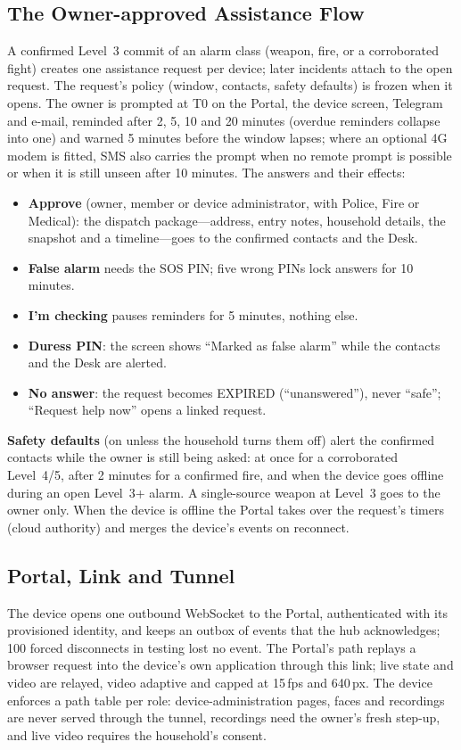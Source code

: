 \subsection{The Owner-approved Assistance Flow}
\label{sec:sos-design}
A confirmed Level~3 commit of an alarm class (weapon, fire, or a corroborated fight) creates one assistance request per device; later incidents attach to the open request. The request's policy (window, contacts, safety defaults) is frozen when it opens. The owner is prompted at T0 on the Portal, the device screen, Telegram and e-mail, reminded after 2, 5, 10 and 20 minutes (overdue reminders collapse into one) and warned 5 minutes before the window lapses; where an optional 4G modem is fitted, SMS also carries the prompt when no remote prompt is possible or when it is still unseen after 10 minutes. The answers and their effects:
\begin{itemize}
\item \textbf{Approve} (owner, member or device administrator, with Police, Fire or Medical): the dispatch package---address, entry notes, household details, the snapshot and a timeline---goes to the confirmed contacts and the Desk.
\item \textbf{False alarm} needs the SOS PIN; five wrong PINs lock answers for 10 minutes.
\item \textbf{I'm checking} pauses reminders for 5 minutes, nothing else.
\item \textbf{Duress PIN}: the screen shows ``Marked as false alarm'' while the contacts and the Desk are alerted.
\item \textbf{No answer}: the request becomes EXPIRED (``unanswered''), never ``safe''; ``Request help now'' opens a linked request.
\end{itemize}
\textbf{Safety defaults} (on unless the household turns them off) alert the confirmed contacts while the owner is still being asked: at once for a corroborated Level~4/5, after 2 minutes for a confirmed fire, and when the device goes offline during an open Level~3+ alarm. A single-source weapon at Level~3 goes to the owner only. When the device is offline the Portal takes over the request's timers (cloud authority) and merges the device's events on reconnect.

\subsection{Portal, Link and Tunnel}
The device opens one outbound WebSocket to the Portal, authenticated with its provisioned identity, and keeps an outbox of events that the hub acknowledges; 100 forced disconnects in testing lost no event. The Portal's  path replays a browser request into the device's own application through this link; live state and video are relayed, video adaptive and capped at 15\,fps and 640\,px. The device enforces a path table per role: device-administration pages, faces and recordings are never served through the tunnel, recordings need the owner's fresh step-up, and live video requires the household's consent.


